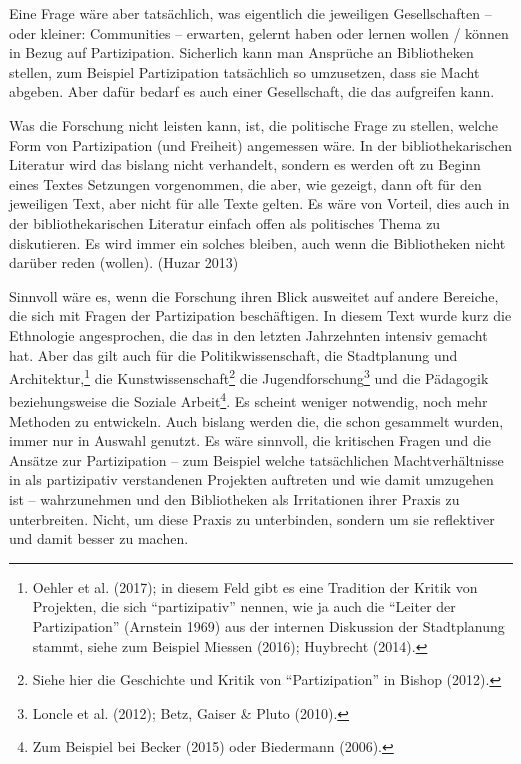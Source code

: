 \documentclass[a4paper,
fontsize=11pt,
oneside,
numbers=noperiodatend,
parskip=half-,
bibliography=totoc,
final
]{scrartcl}
\begin{document}
Eine Frage wäre aber tatsächlich, was eigentlich die jeweiligen
Gesellschaften -- oder kleiner: Communities -- erwarten, gelernt haben
oder lernen wollen / können in Bezug auf Partizipation. Sicherlich kann
man Ansprüche an Bibliotheken stellen, zum Beispiel Partizipation
tatsächlich so umzusetzen, dass sie Macht abgeben. Aber dafür bedarf es
auch einer Gesellschaft, die das aufgreifen kann.

Was die Forschung nicht leisten kann, ist, die politische Frage zu
stellen, welche Form von Partizipation (und Freiheit) angemessen wäre.
In der bibliothekarischen Literatur wird das bislang nicht verhandelt,
sondern es werden oft zu Beginn eines Textes Setzungen vorgenommen, die
aber, wie gezeigt, dann oft für den jeweiligen Text, aber nicht für alle
Texte gelten. Es wäre von Vorteil, dies auch in der bibliothekarischen
Literatur einfach offen als politisches Thema zu diskutieren. Es wird
immer ein solches bleiben, auch wenn die Bibliotheken nicht darüber
reden (wollen). (Huzar 2013)

Sinnvoll wäre es, wenn die Forschung ihren Blick ausweitet auf andere
Bereiche, die sich mit Fragen der Partizipation beschäftigen. In diesem
Text wurde kurz die Ethnologie angesprochen, die das in den letzten
Jahrzehnten intensiv gemacht hat. Aber das gilt auch für die
Politikwissenschaft, die Stadtplanung und Architektur,\footnote{Oehler
  et al. (2017); in diesem Feld gibt es eine Tradition der Kritik von
  Projekten, die sich \enquote{partizipativ} nennen, wie ja auch die
  \enquote{Leiter der Partizipation} (Arnstein 1969) aus der internen
  Diskussion der Stadtplanung stammt, siehe zum Beispiel Miessen (2016);
  Huybrecht (2014).} die Kunstwissenschaft\footnote{Siehe hier die
  Geschichte und Kritik von \enquote{Partizipation} in Bishop (2012).}
die Jugendforschung\footnote{Loncle et al. (2012); Betz, Gaiser \& Pluto
  (2010).} und die Pädagogik beziehungsweise die Soziale
Arbeit\footnote{Zum Beispiel bei Becker (2015) oder Biedermann (2006).}.
Es scheint weniger notwendig, noch mehr Methoden zu entwickeln. Auch
bislang werden die, die schon gesammelt wurden, immer nur in Auswahl
genutzt. Es wäre sinnvoll, die kritischen Fragen und die Ansätze zur
Partizipation -- zum Beispiel welche tatsächlichen Machtverhältnisse in
als partizipativ verstandenen Projekten auftreten und wie damit
umzugehen ist -- wahrzunehmen und den Bibliotheken als Irritationen
ihrer Praxis zu unterbreiten. Nicht, um diese Praxis zu unterbinden,
sondern um sie reflektiver und damit besser zu machen.
\end{document}
